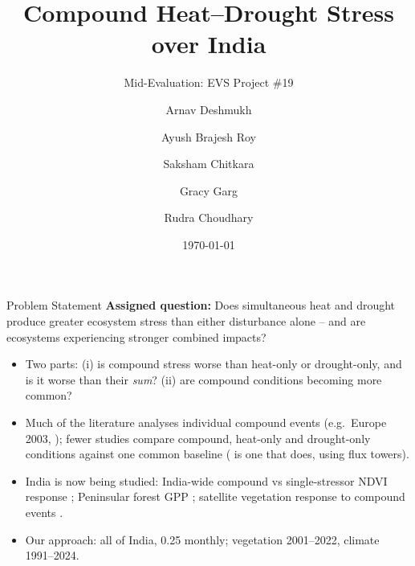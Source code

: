 \documentclass[12pt,aspectratio=169]{beamer}
\title[Compound Heat-Drought Stress]{Compound Heat--Drought Stress over India}
\subtitle{Mid-Evaluation: EVS Project \#19}
\author[Deshmukh et al.]{
  Arnav Deshmukh \and Ayush Brajesh Roy \and Saksham Chitkara \and
  Gracy Garg \and Rudra Choudhary
}
\institute{IIIT Hyderabad}
\date{\today}
\begin{document}
\frame{\titlepage}

\begin{frame}{Problem Statement}
  \small
  \textbf{Assigned question:} Does simultaneous heat and drought produce
  greater ecosystem stress than either disturbance alone -- and are ecosystems
  experiencing stronger combined impacts?

  \vspace{6pt}
  \begin{itemize}
    \item Two parts: (i) is compound stress worse than heat-only or
      drought-only, and is it worse than their \emph{sum}? (ii) are compound
      conditions becoming more common?
    \item Much of the literature analyses individual compound events (e.g.\
      Europe 2003, \citealp{ciais2005}); fewer studies compare compound,
      heat-only and drought-only conditions against one common baseline
      (\citealp{vonbuttlar2018} is one that does, using flux towers).
    \item India is now being studied: India-wide compound vs single-stressor
      NDVI response \citep{meena2026}; Peninsular forest GPP
      \citep{sen2026}; satellite vegetation response to compound events
      \citep{malik2025}.
    \item Our approach: all of India, 0.25\textdegree{} monthly; vegetation
      2001--2022, climate 1991--2024.
  \end{itemize}
\end{frame}
\end{document}
